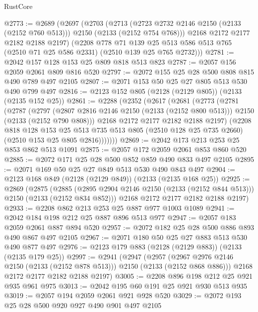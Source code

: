 \begin{lexlean}{RustCore}
\begin{coremodule}
@2773 := @2689
    (@2697
      (@2703
        (@2713 (@2723 @2732 @2146 @2150 (@2133 (@2152 @760 @513))) @2150 (@2133 (@2152 @754 @768)))
        @2168
        @2172
        @2177
        @2182
        @2188
        @2197)
      (@2208
        @778
        @71
        @139
        @25
        @513
        @586
        @513
        @765
        (@2510 @71 @25 @586 @2331)
        (@2510 @139 @25 @765 @2732)))
@2781 := @2042 @157 @128 @153 @25 @809 @818 @513 @823
@2787 := @2057 @156 @2059 @2061 @809 @816 @520
@2797 := @2072 @155 @25 @28 @500 @808 @815 @490 @789 @497 @2105
@2807 := @2071 @153 @50 @25 @27 @805 @513 @530 @490 @799 @497
@2816 := @2123 @152 @805 (@2128 (@2129 @805)) (@2133 (@2135 @152 @25))
@2861 := @2288
    (@2352
      (@2617
        (@2681
          (@2773
            (@2781
              (@2787
                (@2797
                  (@2807 @2816 @2146 @2150 (@2133 (@2152 @800 @513)))
                  @2150
                  (@2133 (@2152 @790 @808)))
                @2168
                @2172
                @2177
                @2182
                @2188
                @2197)
              (@2208
                @818
                @128
                @153
                @25
                @513
                @735
                @513
                @805
                (@2510 @128 @25 @735 @2660)
                (@2510 @153 @25 @805 @2816)))))))
@2869 := @2042 @173 @213 @253 @25 @853 @862 @513 @1091
@2875 := @2057 @172 @2059 @2061 @853 @860 @520
@2885 := @2072 @171 @25 @28 @500 @852 @859 @490 @833 @497 @2105
@2895 := @2071 @169 @50 @25 @27 @849 @513 @530 @490 @843 @497
@2904 := @2123 @168 @849 (@2128 (@2129 @849)) (@2133 (@2135 @168 @25))
@2925 := @2869
    (@2875
      (@2885 (@2895 @2904 @2146 @2150 (@2133 (@2152 @844 @513))) @2150 (@2133 (@2152 @834 @852)))
      @2168
      @2172
      @2177
      @2182
      @2188
      @2197)
@2933 := @2208 @862 @213 @253 @25 @887 @977 @1003 @1089
@2941 := @2042 @184 @198 @212 @25 @887 @896 @513 @977
@2947 := @2057 @183 @2059 @2061 @887 @894 @520
@2957 := @2072 @182 @25 @28 @500 @886 @893 @490 @867 @497 @2105
@2967 := @2071 @180 @50 @25 @27 @883 @513 @530 @490 @877 @497
@2976 := @2123 @179 @883 (@2128 (@2129 @883)) (@2133 (@2135 @179 @25))
@2997 := @2941
    (@2947
      (@2957 (@2967 @2976 @2146 @2150 (@2133 (@2152 @878 @513))) @2150 (@2133 (@2152 @868 @886)))
      @2168
      @2172
      @2177
      @2182
      @2188
      @2197)
@3005 := @2208 @896 @198 @212 @25 @921 @935 @961 @975
@3013 := @2042 @195 @60 @191 @25 @921 @930 @513 @935
@3019 := @2057 @194 @2059 @2061 @921 @928 @520
@3029 := @2072 @193 @25 @28 @500 @920 @927 @490 @901 @497 @2105

\end{coremodule}
\end{lexlean}
